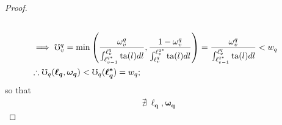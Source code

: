 \documentclass[hidelinks, nonatbib]{elsarticle}
\begin{document}
\begin{lemma}
\begin{proof}
\begin{align}
            \\
            &\implies
            \mho_{v}^{q} = 
            \min\left(
                \frac{
                    \omega_{v}^{q}
                }{
                    \int_{
                        \ell_{v-1}^{q*}
                    }^{
                        \ell_{v}^{q}
                    }
                    \text{ta}(l)dl
                }
                ,
                \frac{
                    1-\omega_{v}^{q}
                }{
                    \int_{
                        \ell_{v}^{q}
                    }^{
                        \ell_{v}^{q*}
                    }
                    \text{ta}(l)dl
                }
            \right)
            =
            \frac{
                \omega_{v}^{q}
            }{
                \int_{
                    \ell_{v-1}^{q*}
                }^{
                    \ell_{v}^{q}
                }
                \text{ta}(l)dl
            }
            <
            w_q
            \\
            &\therefore
            \mho_{q}(
                \boldsymbol{\ell_q}
                ,\boldsymbol{\omega_q}
            ) 
            <
            \mho_{q}(
                \boldsymbol{\ell_{q}^{*}}
            )
            =
            w_q
            ;
        \end{align}
        so that 
        \begin{gather}
            \nexists \
            \boldsymbol{\ell_q}
            ,
            \boldsymbol{\omega_q}

\end{gather}
\end{proof}
\end{lemma}
\end{document}

